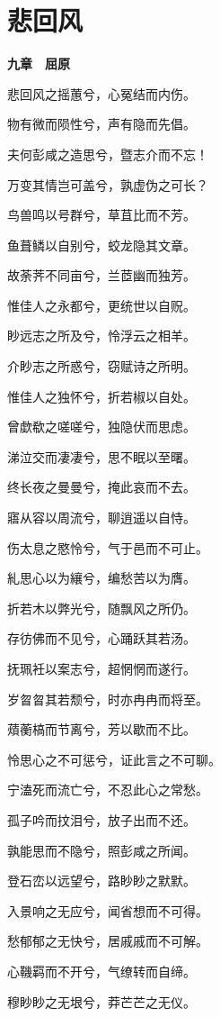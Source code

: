 \documentclass[12pt,a4paper]{ctexbook}
\begin{document}
\section{悲回风}
\textbf{九章　屈原}\par\vspace{0.5em}
悲回风之摇蕙兮，心冤结而内伤。\par
物有微而陨性兮，声有隐而先倡。\par
夫何彭咸之造思兮，暨志介而不忘！\par
万变其情岂可盖兮，孰虚伪之可长？\par
鸟兽鸣以号群兮，草苴比而不芳。\par
鱼葺鳞以自别兮，蛟龙隐其文章。\par
故荼荠不同亩兮，兰茝幽而独芳。\par
惟佳人之永都兮，更统世以自贶。\par
眇远志之所及兮，怜浮云之相羊。\par
介眇志之所惑兮，窃赋诗之所明。\par
惟佳人之独怀兮，折若椒以自处。\par
曾歔欷之嗟嗟兮，独隐伏而思虑。\par
涕泣交而凄凄兮，思不眠以至曙。\par
终长夜之曼曼兮，掩此哀而不去。\par
寤从容以周流兮，聊逍遥以自恃。\par
伤太息之愍怜兮，气于邑而不可止。\par
糺思心以为纕兮，编愁苦以为膺。\par
折若木以弊光兮，随飘风之所仍。\par
存彷佛而不见兮，心踊跃其若汤。\par
抚珮衽以案志兮，超惘惘而遂行。\par
岁曶曶其若颓兮，时亦冉冉而将至。\par
薠蘅槁而节离兮，芳以歇而不比。\par
怜思心之不可惩兮，证此言之不可聊。\par
宁溘死而流亡兮，不忍此心之常愁。\par
孤子吟而抆泪兮，放子出而不还。\par
孰能思而不隐兮，照彭咸之所闻。\par
登石峦以远望兮，路眇眇之默默。\par
入景响之无应兮，闻省想而不可得。\par
愁郁郁之无快兮，居戚戚而不可解。\par
心鞿羁而不开兮，气缭转而自缔。\par
穆眇眇之无垠兮，莽芒芒之无仪。\par
\end{document}
